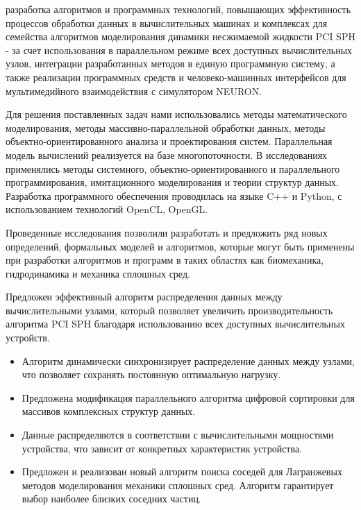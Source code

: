 {\aim} разработка алгоритмов и программных технологий,  повышающих эффективность процессов обработки данных в вычислительных машинах и комплексах для семейства алгоритмов моделирования динамики несжимаемой жидкости PCI SPH - за счет использования в параллельном режиме  всех доступных вычислительных узлов,  интеграции разработанных методов в единую программную систему, \colorbox{red!30}{ а также реализации программных средств и человеко-машинных интерфейсов для мультимедийного взаимодействия с симулятором NEURON}.

{\methods}Для решения поставленных задач нами использовались методы математического моделирования, методы массивно-параллельной обработки данных, методы объектно-ориентированного анализа и проектирования систем. Параллельная модель вычислений реализуется на базе многопоточности. В исследованиях применялись методы системного, объектно-ориенти­рованного и параллельного программирования, имитационного моделирования и теории структур данных. Разработка программного обеспечения проводилась на языке C++ и Python, с использованием технологий OpenCL, OpenGL.

{\novelty} Проведенные исследования позволили разработать и предложить ряд новых определений, формальных моделей и алгоритмов, которые могут быть применены при разработки алгоритмов и программ в таких областях как биомеханика, гидродинамика и механика сплошных сред.

Предложен эффективный алгоритм распределения данных между вычислительными узлами, который позволяет увеличить производительность алгоритма PCI SPH благодаря использованию всех доступных вычислительных устройств.

\begin{itemize}
  \item{Алгоритм динамически синхронизирует распределение данных между узлами, что позволяет сохранять постоянную  оптимальную нагрузку.}
  \item{Предложена модификация параллельного алгоритма цифровой сортировки для массивов комплексных структур данных.}
  \item{Данные распределяются в соответствии с вычислительными мощностями устройства, что зависит от конкретных характеристик устройства. }
  \item{Предложен и реализован новый алгоритм поиска соседей для Лагранжевых методов моделирования механики сплошных сред. Алгоритм гарантирует выбор наиболее близких соседних частиц.}
\end{itemize}

